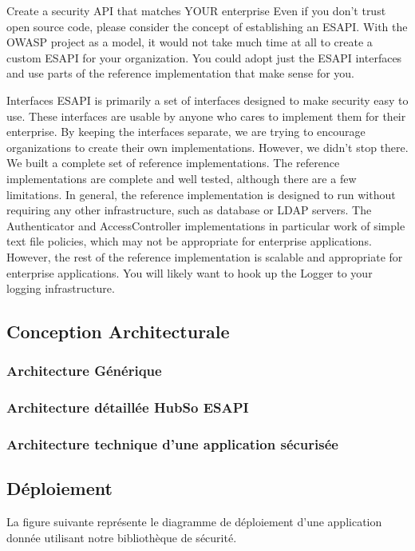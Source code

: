 Create a security API that matches YOUR enterprise
Even if you don’t trust open source code, please consider the concept of establishing an ESAPI. With the OWASP project as a model, it would not take much time at all to create a custom ESAPI for your
organization. You could adopt just the ESAPI interfaces and use parts of the reference implementation
that make sense for you.

Interfaces
ESAPI is primarily a set of interfaces designed to make security easy to use. These interfaces are usable by anyone who cares to implement them for their enterprise. By keeping the interfaces separate, we are trying to encourage organizations to create their own implementations.
However, we didn’t stop there. We built a complete set of reference implementations. The reference
implementations are complete and well tested, although there are a few limitations. In general, the
reference implementation is designed to run without requiring any other infrastructure, such as
database or LDAP servers. The Authenticator and AccessController implementations in particular work of simple text file policies, which may not be appropriate for enterprise applications. However, the rest of the reference implementation is scalable and appropriate for enterprise applications. You will likely want to hook up the Logger to your logging infrastructure. 

\subsection{Conception Architecturale}
\subsubsection{Architecture Générique}
\subsubsection{Architecture détaillée HubSo ESAPI}
\subsubsection{Architecture technique d'une application sécurisée}
\subsection{Déploiement}
La figure suivante représente le diagramme de déploiement d'une application donnée utilisant notre bibliothèque de sécurité.
